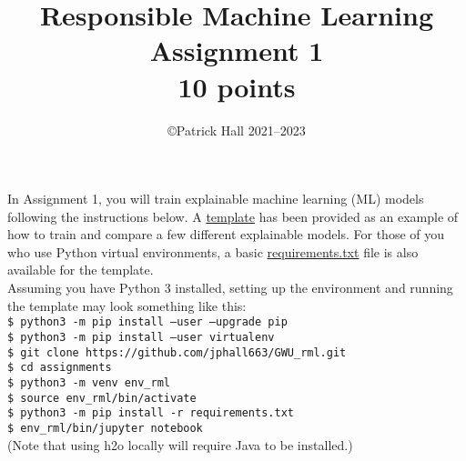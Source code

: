 \documentclass[fleqn]{article}
\title{Responsible Machine Learning\\\Large{Assignment 1}\\\Large{10 points}}
\author{\copyright Patrick Hall 2021--2023}
\begin{document}
\maketitle

\noindent In Assignment 1, you will train explainable machine learning (ML) models following the instructions below. A \href{https://nbviewer.jupyter.org/github/jphall663/GWU_rml/blob/master/assignments/assignment_1/assign_1_template.ipynb?flush_cache=true}{template} has been provided as an example of how to train and compare a few different explainable models. For those of you who use Python virtual environments, a basic \href{https://github.com/jphall663/GWU_rml/blob/master/assignments/requirements.txt}{requirements.txt} file is also available for the template.\\

\noindent Assuming you have Python 3 installed, setting up the environment and running the template may look something like this:\\ 
\noindent \texttt{\$ python3 -m pip install --user --upgrade pip}\\
\noindent \texttt{\$ python3 -m pip install --user virtualenv}\\
\noindent \texttt{\$ git clone https://github.com/jphall663/GWU\_rml.git}\\
\noindent \texttt{\$ cd assignments}\\
\noindent \texttt{\$ python3 -m venv env\_rml}\\
\noindent \texttt{\$ source env\_rml/bin/activate}\\
\noindent \texttt{\$ python3 -m pip install -r requirements.txt}\\
\noindent \texttt{\$ env\_rml/bin/jupyter notebook}\\

\noindent (Note that using h2o locally will require Java to be installed.)\\
\end{document}
